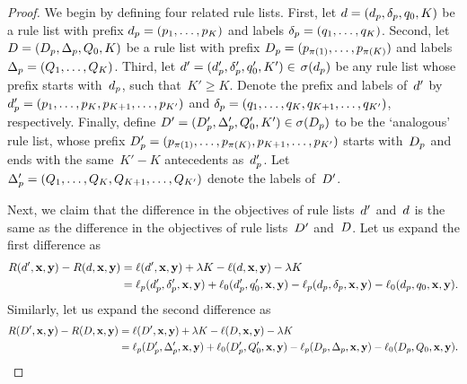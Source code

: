\begin{proof}
We begin by defining four related rule lists.
%
First, let ${{d} = (d_p, \delta_p, q_0, K)}$
be a rule list with prefix ${d_p = (p_1, \dots, p_K)}$
and labels ${\delta_p = (q_1, \dots, q_K)}$.
%
Second, let ${{D} = (D_p, \Delta_p, Q_0, K)}$
be a rule list with prefix
${D_p = (p_{\pi(1)}, \dots, p_{\pi(K)})}$
and labels ${\Delta_p = (Q_1, \dots, Q_K)}$.
%
Third, let ${{d}' = (d_p', \delta_p', q_0', K') \in}$
${\sigma(d_p)}$ be any rule list
whose prefix starts with~$d_p$, such that~${K' \ge K}$.
%
Denote the prefix and labels of~${d}'$ by
${d_p' = (p_1, \dots, p_K, p_{K+1}, \dots, p_{K'})}$
and ${\delta_p = (q_1, \dots, q_K, q_{K+1}, \dots, q_{K'})}$,
respectively.
%
Finally, define
${{D}' = (D_p', \Delta_p', Q_0', K') \in \sigma(D_p)}$
to be the `analogous' rule list, \ie whose prefix
${D_p' = (p_{\pi(1)}, \dots, p_{\pi(K)}, p_{K+1}, \dots, p_{K'})}$
starts with~$D_p$ and ends with the same~${K'-K}$
antecedents as~$d_p'$.
%
Let ${\Delta_p' = (Q_1, \dots, Q_K, Q_{K+1}, \dots, Q_{K'})}$
denote the labels of~${D}'$.

Next, we claim that the difference in the objectives
of rule lists~${d}'$ and~${d}$ is the same as the difference
in the objectives of rule lists~${D}'$ and~${D}$.
%
Let us expand the first difference as
\begin{align}
\Obj(\RL', \x, \y) - \Obj(\RL, \x, \y)
&= \Loss(\RL', \x, \y) + \Reg K - \Loss(\RL, \x, \y) - \Reg K \nn \\
&= \Loss_p(\Prefix', \Labels', \x, \y) + \Loss_0(\Prefix', \Default', \x, \y)
  - \Loss_p(\Prefix, \Labels, \x, \y) - \Loss_0(\Prefix, \Default, \x, \y).
\end{align}
Similarly, let us expand the second difference as
\begin{align}
\Obj(\RLB', \x, \y) - \Obj(\RLB, \x, \y)
&= \Loss(\RLB', \x, \y) + \Reg K - \Loss(\RLB, \x, \y) - \Reg K \nn \\
&= \Loss_p(\PrefixB', \LabelsB', \x, \y) + \Loss_0(\PrefixB', \DefaultB', \x, \y)
  - \Loss_p(\PrefixB, \LabelsB, \x, \y) - \Loss_0(\PrefixB, \DefaultB, \x, \y).
\end{align}


\end{proof}
